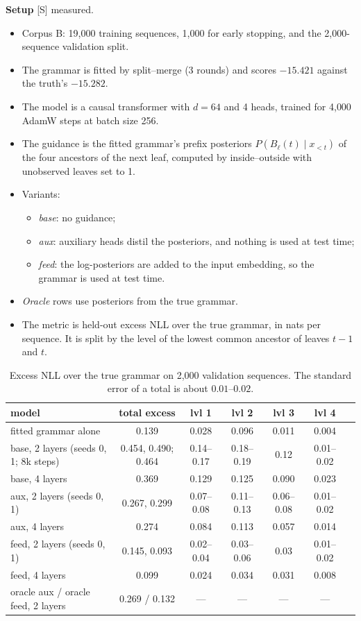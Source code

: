 \documentclass[11pt]{article}
\theoremstyle{definition}
\theoremstyle{remark}
\newcommand{\src}[1]{\textsf{\small[#1]}}
\newcommand{\st}[1]{\textsf{\small\color{gray}#1}}
\begin{document}
\textbf{Setup} \src{S} \st{measured}.
\begin{itemize}
  \item Corpus B: 19{,}000 training sequences, 1{,}000 for early stopping, and the 2{,}000-sequence validation split.
  \item The grammar is fitted by split--merge (3 rounds) and scores $-15.421$ against the truth's $-15.282$.
  \item The model is a causal transformer with $d=64$ and 4 heads, trained for 4{,}000 AdamW steps at batch size 256.
  \item The guidance is the fitted grammar's prefix posteriors $P(B_\ell(t)\mid x_{<t})$ of the four ancestors of the next leaf, computed by inside--outside with unobserved leaves set to 1.
  \item Variants:
  \begin{itemize}
    \item \emph{base}: no guidance;
    \item \emph{aux}: auxiliary heads distil the posteriors, and nothing is used at test time;
    \item \emph{feed}: the log-posteriors are added to the input embedding, so the grammar is used at test time.
  \end{itemize}
  \item \emph{Oracle} rows use posteriors from the true grammar.
  \item The metric is held-out excess NLL over the true grammar, in nats per sequence. It is split by the level of the lowest common ancestor of leaves $t-1$ and $t$.
\end{itemize}
\begin{table}[!htbp]\centering\small
\begin{tabular}{lcccccc}
\toprule
model & total excess & lvl 1 & lvl 2 & lvl 3 & lvl 4\\
\midrule
fitted grammar alone & 0.139 & 0.028 & 0.096 & 0.011 & 0.004\\
base, 2 layers (seeds 0, 1; 8k steps) & 0.454, 0.490; 0.464 & 0.14--0.17 & 0.18--0.19 & 0.12 & 0.01--0.02\\
base, 4 layers & 0.369 & 0.129 & 0.125 & 0.090 & 0.023\\
aux, 2 layers (seeds 0, 1) & 0.267, 0.299 & 0.07--0.08 & 0.11--0.13 & 0.06--0.08 & 0.01--0.02\\
aux, 4 layers & 0.274 & 0.084 & 0.113 & 0.057 & 0.014\\
feed, 2 layers (seeds 0, 1) & 0.145, 0.093 & 0.02--0.04 & 0.03--0.06 & 0.03 & 0.01--0.02\\
feed, 4 layers & 0.099 & 0.024 & 0.034 & 0.031 & 0.008\\
oracle aux / oracle feed, 2 layers & 0.269 / 0.132 & --- & --- & --- & ---\\
\bottomrule
\end{tabular}
\caption{Excess NLL over the true grammar on 2{,}000 validation sequences. The standard error of a total is about $0.01$--$0.02$.}
\end{table}
\end{document}
